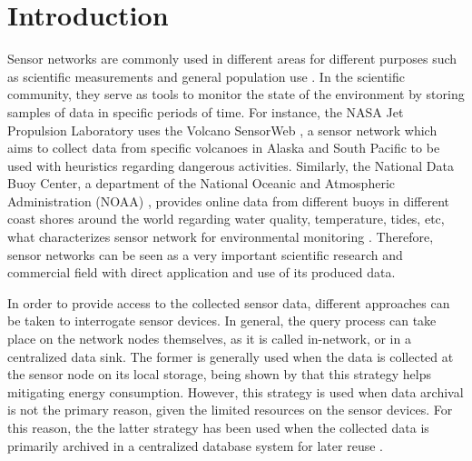 


\chapter{Introduction}

Sensor networks are commonly used in different areas for different purposes
such as scientific measurements and general population use
\cite{snintro01} \cite{snintro02}. In the scientific community, they serve as
tools to monitor the state of the environment by storing samples of data in specific 
periods of time. For instance, the NASA Jet Propulsion Laboratory uses the 
Volcano SensorWeb \cite{snex02}, a sensor network which aims to collect data
from specific volcanoes in Alaska and South Pacific to be used with heuristics 
regarding dangerous activities. Similarly, the National Data Buoy Center, a
department of the National Oceanic and Atmospheric Administration (NOAA)
\cite{snex03}, provides online data from different buoys in different coast
shores around the world regarding water quality, temperature, tides, etc, what 
characterizes sensor network for environmental monitoring \cite{snex01}.
Therefore, sensor networks can be seen as a very important scientific research and 
commercial field with direct application and use of its produced data.

In order to provide access to the collected sensor data, different approaches
can be taken to interrogate sensor devices. In general, the query process can
take place on the network nodes themselves, as it is called in-network, or in 
a centralized data sink. The former is generally used when the data is
collected at the sensor node on its local storage, being shown by \cite{sn-storage01}
\cite{sn-storage03} \cite{sn-storage04} that this strategy helps mitigating energy
consumption. However, this strategy is used when data archival is not the
primary reason, given the limited resources on the sensor devices. For this
reason, the the latter strategy has been used when the collected data is
primarily archived in a centralized database system for later reuse
\cite{sn-storage02}.

